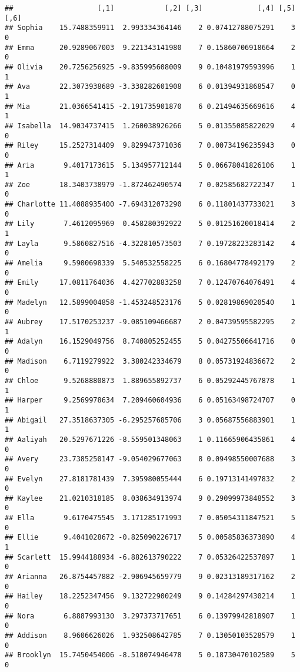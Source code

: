 \documentclass[
]{article}
\begin{document}
\begin{verbatim}
##                    [,1]            [,2] [,3]             [,4] [,5] [,6]
## Sophia    15.7488359911  2.993334364146    2 0.07412788075291    3    0
## Emma      20.9289067003  9.221343141980    7 0.15860706918664    2    0
## Olivia    20.7256256925 -9.835995608009    9 0.10481979593996    1    1
## Ava       22.3073938689 -3.338282601908    6 0.01394931868547    0    1
## Mia       21.0366541415 -2.191735901870    6 0.21494635669616    4    1
## Isabella  14.9034737415  1.260038926266    5 0.01355085822029    4    0
## Riley     15.2527314409  9.829947371036    7 0.00734196235943    0    0
## Aria       9.4017173615  5.134957712144    5 0.06678041826106    1    1
## Zoe       18.3403738979 -1.872462490574    7 0.02585682722347    1    0
## Charlotte 11.4088935400 -7.694312073290    6 0.11801437733021    3    0
## Lily       7.4612095969  0.458280392922    5 0.01251620018414    2    1
## Layla      9.5860827516 -4.322810573503    7 0.19728223283142    4    0
## Amelia     9.5900698339  5.540532558225    6 0.16804778492179    2    0
## Emily     17.0811764036  4.427702883258    7 0.12470764076491    4    0
## Madelyn   12.5899004858 -1.453248523176    5 0.02819869020540    1    0
## Aubrey    17.5170253237 -9.085109466687    2 0.04739595582295    2    1
## Adalyn    16.1529049756  8.740805252455    5 0.04275506641716    0    0
## Madison    6.7119279922  3.380242334679    8 0.05731924836672    2    0
## Chloe      9.5268880873  1.889655892737    6 0.05292445767878    1    1
## Harper     9.2569978634  7.209460604936    6 0.05163498724707    0    1
## Abigail   27.3518637305 -6.295257685706    3 0.05687556883901    1    1
## Aaliyah   20.5297671226 -8.559501348063    1 0.11665906435861    4    0
## Avery     23.7385250147 -9.054029677063    8 0.09498550007688    3    0
## Evelyn    27.8181781439  7.395980055444    6 0.19713141497832    2    0
## Kaylee    21.0210318185  8.038634913974    9 0.29099973848552    3    0
## Ella       9.6170475545  3.171285171993    7 0.05054311847521    5    0
## Ellie      9.4041028672 -0.825090226717    5 0.00585836373890    4    1
## Scarlett  15.9944188934 -6.882613790222    7 0.05326422537897    1    0
## Arianna   26.8754457882 -2.906945659779    9 0.02313189317162    2    0
## Hailey    18.2252347456  9.132722900249    9 0.14284297430214    1    0
## Nora       6.8887993130  3.297373717651    6 0.13979942818907    1    0
## Addison    8.9606626026  1.932508642785    7 0.13050103528579    1    0
## Brooklyn  15.7450454006 -8.518074946478    5 0.18730470102589    5    0

\end{verbatim}
\end{document}
